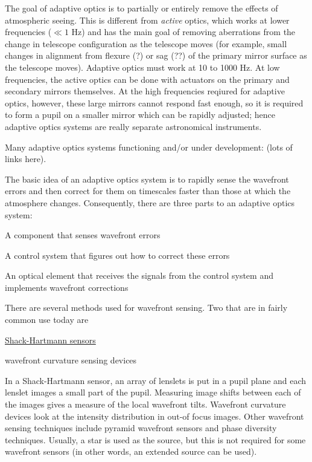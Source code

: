 \documentclass[12pt]{article}
\begin{document}

The goal of adaptive optics is to partially or entirely remove the
effects of atmospheric seeing.
This is different from \emph{active} optics, which works at lower
frequencies ($\ll1$ Hz) and has the main goal of removing aberrations
from the change in telescope configuration as the telescope moves
(for example, small changes in alignment from flexure (?) or sag (??)
of the primary mirror surface as the telescope moves).
Adaptive optics must work at 10 to 1000 Hz.
At low frequencies, the active optics can be done
with actuators on the primary and secondary mirrors themselves.
At the high frequencies reqiured for adaptive optics, however, these large
mirrors cannot respond fast enough, so it is required to form a pupil
on a smaller mirror which can be rapidly adjusted;
hence adaptive optics systems are really separate astronomical instruments.

Many adaptive optics systems functioning and/or under development:
(lots of links here).

The basic idea of an adaptive optics system is to rapidly sense the
wavefront errors and then correct for them on timescales faster
than those at which the atmosphere changes. Consequently, there are
three parts to an adaptive optics system:
\begin{enumerate*}
    \item A component that senses wavefront errors
    \item A control system that figures out how to correct these errors
    \item An optical element that receives the signals from the
        control system and implements wavefront corrections
\end{enumerate*}

There are several methods used for wavefront sensing. Two that are in
fairly common use today are
\begin{enumerate*}
    \item \href{http://astronomy.nmsu.edu/holtz/a535/html/diagrams/a535/beckers3.htm}
        {Shack-Hartmann sensors}
    \item wavefront curvature sensing devices
\end{enumerate*}
In a
Shack-Hartmann sensor, an array of lenslets is put in a pupil plane
and each lenslet images a small part of the pupil. Measuring image
shifts between each of the images gives a measure of the local
wavefront tilts. Wavefront curvature devices look at the intensity
distribution in out-of focus images. Other wavefront sensing
techniques include pyramid wavefront sensors and phase diversity
techniques. Usually, a star is used as the source, but this is not
required for some wavefront sensors
(in other words, an extended source can be used).
\end{document}
